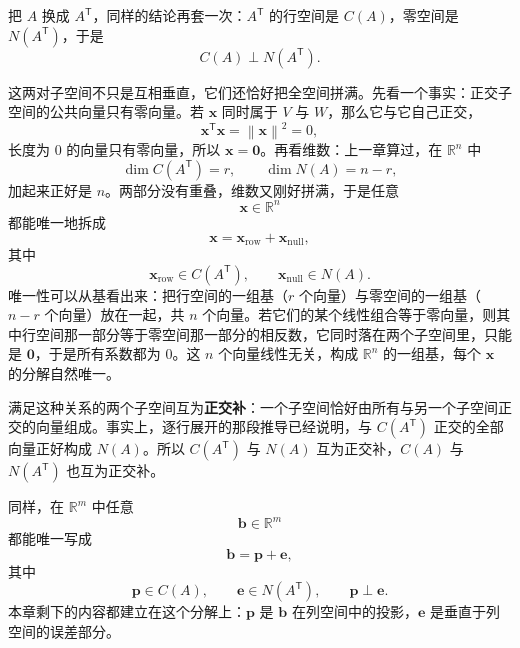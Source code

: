 \documentclass[UTF8,a4paper,12pt]{ctexart}
\numberwithin{equation}{section}
\newcommand{\R}{\mathbb{R}}
\newcommand{\norm}[1]{\left\lVert #1 \right\rVert}
\newcommand{\trans}{^{\mathsf T}}
\begin{document}
	把 $A$ 换成 $A\trans$，同样的结论再套一次：$A\trans$ 的行空间是 $C(A)$，零空间是 $N(A\trans)$，于是
	\begin{equation}\label{eq:6.10}
	\boxed{C(A)\perp N(A\trans).}
	\end{equation}

	这两对子空间不只是互相垂直，它们还恰好把全空间拼满。先看一个事实：正交子空间的公共向量只有零向量。若 $\bm{x}$ 同时属于 $V$ 与 $W$，那么它与它自己正交，
	\begin{equation}\label{eq:6.11}
	\bm{x}\trans\bm{x}=\norm{\bm{x}}^2=0,
	\end{equation}
	长度为 $0$ 的向量只有零向量，所以 $\bm{x}=\bm{0}$。再看维数：上一章算过，在 $\R^n$ 中
	\begin{equation}\label{eq:6.12}
	\dim C(A\trans)=r,
	\qquad
	\dim N(A)=n-r,
	\end{equation}
	加起来正好是 $n$。两部分没有重叠，维数又刚好拼满，于是任意
	\begin{equation}\label{eq:6.13}
	\bm{x}\in\R^n
	\end{equation}
	都能唯一地拆成
	\begin{equation}\label{eq:6.14}
	\bm{x}=\bm{x}_{\mathrm{row}}+\bm{x}_{\mathrm{null}},
	\end{equation}
	其中
	\begin{equation}\label{eq:6.15}
	\bm{x}_{\mathrm{row}}\in C(A\trans),
	\qquad
	\bm{x}_{\mathrm{null}}\in N(A).
	\end{equation}
	唯一性可以从基看出来：把行空间的一组基（$r$ 个向量）与零空间的一组基（$n-r$ 个向量）放在一起，共 $n$ 个向量。若它们的某个线性组合等于零向量，则其中行空间那一部分等于零空间那一部分的相反数，它同时落在两个子空间里，只能是 $\bm{0}$，于是所有系数都为 $0$。这 $n$ 个向量线性无关，构成 $\R^n$ 的一组基，每个 $\bm{x}$ 的分解自然唯一。

	满足这种关系的两个子空间互为\textbf{正交补}：一个子空间恰好由所有与另一个子空间正交的向量组成。事实上，逐行展开的那段推导已经说明，与 $C(A\trans)$ 正交的全部向量正好构成 $N(A)$。所以 $C(A\trans)$ 与 $N(A)$ 互为正交补，$C(A)$ 与 $N(A\trans)$ 也互为正交补。

	同样，在 $\R^m$ 中任意
	\begin{equation}\label{eq:6.16}
	\bm{b}\in\R^m
	\end{equation}
	都能唯一写成
	\begin{equation}\label{eq:6.17}
	\bm{b}=\bm{p}+\bm{e},
	\end{equation}
	其中
	\begin{equation}\label{eq:6.18}
	\bm{p}\in C(A),
	\qquad
	\bm{e}\in N(A\trans),
	\qquad
	\bm{p}\perp\bm{e}.
	\end{equation}
	本章剩下的内容都建立在这个分解上：$\bm{p}$ 是 $\bm{b}$ 在列空间中的投影，$\bm{e}$ 是垂直于列空间的误差部分。
\end{document}
